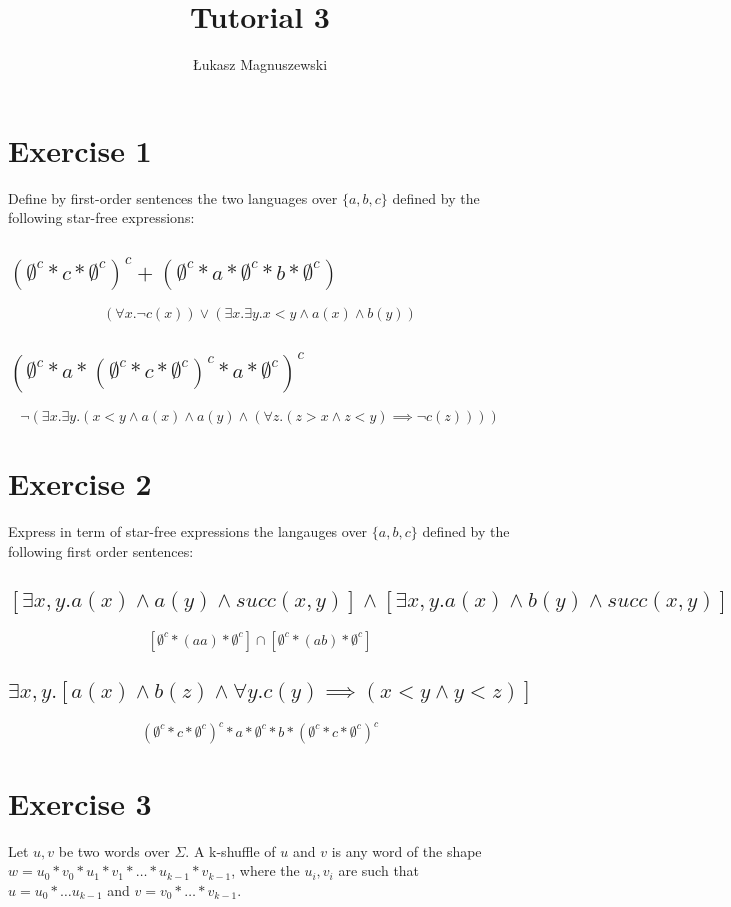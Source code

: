 \documentclass{article}
\author{Łukasz Magnuszewski}
\title{Tutorial 3}
\begin{document}
\maketitle

\section{Exercise 1}
Define by first-order sentences the two languages over $\{a,b,c\}$ defined by the following star-free expressions:
\subsection{$(\emptyset^c * c * \emptyset^c)^c + 
(\emptyset^c * a * \emptyset^c * b * \emptyset^c)$}
\[
  (\forall x. \neg c(x)) \lor (\exists x. \exists y. x < y \land a(x) \land b(y))
\]
\subsection{$(\emptyset^c * a * (\emptyset^c * c * \emptyset^c)^c * a * \emptyset^c)^c$}
\[
  \neg (\exists x. \exists y. (x < y \land a(x) \land a(y) \land (\forall z. (z > x \land z < y) \implies \neg c(z))))
\]

\section{Exercise 2}
Express in term of star-free expressions the langauges over $\{a, b, c\}$ defined by the following first order sentences:
\subsection{$[\exists x,y. a(x) \land a(y) \land succ(x,y)] \land [\exists x,y. a(x) \land b(y)\land succ(x,y)]$}
\[
  [\emptyset^c * (aa) * \emptyset^c] \cap [ \emptyset^c * (ab) * \emptyset^c] 
\]

\subsection*{$\exists x,y.[a(x)\land b(z) \land \forall y. c(y) \implies (x < y \land y < z)]$}

\[
  (\emptyset^c * c * \emptyset^c)^c * a * \emptyset^c * b * (\emptyset^c * c * \emptyset^c)^c
\]
\section{Exercise 3}
Let $u, v$ be two words over $\Sigma$. A k-shuffle of $u$ and $v$ is any word of the shape 
$w = u_0 * v_0 * u_1 * v_1 * \ldots * u_{k-1} * v_{k-1}$, where the $u_i, v_i$ are such that
$u = u_0 * \ldots u_{k-1}$ and $v = v_0 * \ldots * v_{k-1}$.
\end{document}
